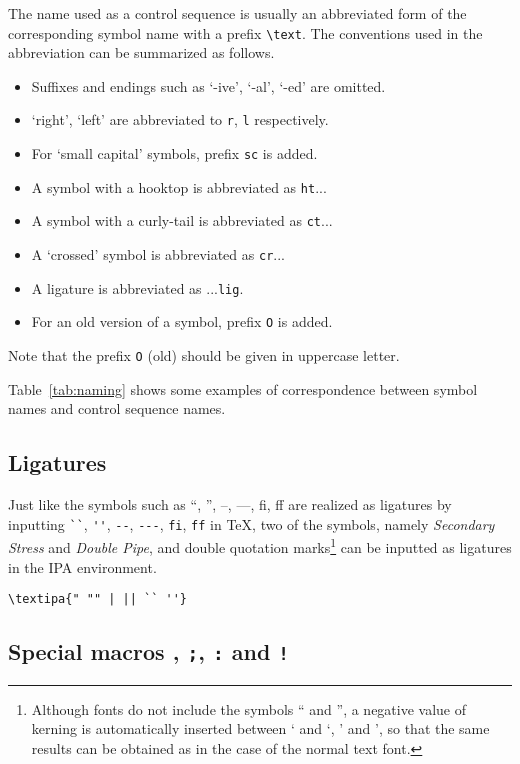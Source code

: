 The name used as a control sequence is usually an abbreviated form of
the corresponding symbol name with a prefix \verb|\text|. The
conventions used in the abbreviation can be summarized as follows.

\begin{itemize}
\itemsep0pt
\item Suffixes and endings such as `-ive', `-al', `-ed' are omitted.
\item `right', `left' are abbreviated to \texttt{r}, \texttt{l} respectively.
\item For `small capital' symbols, prefix \texttt{sc} is added.
\item A symbol with a hooktop is abbreviated as \texttt{ht}...
\item A symbol with a curly-tail is abbreviated as \texttt{ct}...
\item A `crossed' symbol is abbreviated as \texttt{cr}...
\item A ligature is abbreviated as ...\texttt{lig}.
\item For an old version of a symbol, prefix \texttt{O} is added.
\end{itemize}

Note that the prefix \texttt{O} (old) should be given in uppercase
letter.

Table~\ref{tab:naming} shows some examples of correspondence between
symbol names and control sequence names.

\subsection{Ligatures}

Just like the symbols such as ``, '', --, ---, fi, ff are realized as
ligatures by inputting \verb|``|, \verb|''|, \verb|--|, \verb|---|,
\verb|fi|, \verb|ff| in \TeX{}, two of the \tipa{} symbols, namely
\textsl{Secondary Stress} and \textsl{Double Pipe}, and double
quotation marks\footnote{Although \tipa{} fonts do not include the
  symbols `` and '', a negative value of kerning is automatically
  inserted between ` and `, ' and ', so that the same results can be
  obtained as in the case of the normal text font.} can be inputted as
ligatures in the IPA environment.

\begin{tipaexample}
  \yitem \verb+\textipa{" "" | || `` ''}+
  \yitem {}
\end{tipaexample}

\subsection{Special macros {\tt\tbs*}, {\tt\tbs;}, {\tt\tbs:} and
  {\tt\tbs!}}\label{sec:specialmacros}

